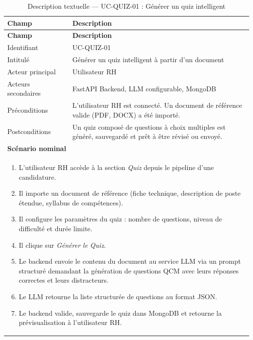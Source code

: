\renewcommand{\arraystretch}{1.4}
\begin{longtable}{|p{4cm}|p{10cm}|}
\caption{Description textuelle — UC-QUIZ-01 : Générer un quiz intelligent}
\label{tab:uc_quiz01} \\
\hline
\rowcolor[HTML]{EFEFEF} \textbf{Champ} & \textbf{Description} \\ \hline
\endfirsthead
\hline
\rowcolor[HTML]{EFEFEF} \textbf{Champ} & \textbf{Description} \\ \hline
\endhead
\hline
\endfoot
\hline
\endlastfoot
Identifiant & UC-QUIZ-01 \\ \hline
Intitulé & Générer un quiz intelligent à partir d'un document \\ \hline
Acteur principal & Utilisateur RH \\ \hline
Acteurs secondaires & FastAPI Backend, LLM configurable, MongoDB \\ \hline
Préconditions & L'utilisateur RH est connecté. Un document de référence valide (PDF, DOCX) a été importé. \\ \hline
Postconditions & Un quiz composé de questions à choix multiples est généré, sauvegardé et prêt à être révisé ou envoyé. \\ \hline
\multicolumn{2}{|l|}{\textbf{Scénario nominal}} \\ \hline
\multicolumn{2}{|p{14.5cm}|}{
\vspace{2pt}
\begin{enumerate}
    \item L'utilisateur RH accède à la section \textit{Quiz} depuis le pipeline d'une candidature.
    \item Il importe un document de référence (fiche technique, description de poste étendue, syllabus de compétences).
    \item Il configure les paramètres du quiz : nombre de questions, niveau de difficulté et durée limite.
    \item Il clique sur \textit{Générer le Quiz}.
    \item Le backend envoie le contenu du document au service LLM via un prompt structuré demandant la génération de questions QCM avec leurs réponses correctes et leurs distracteurs.
    \item Le LLM retourne la liste structurée de questions au format JSON.
    \item Le backend valide, sauvegarde le quiz dans MongoDB et retourne la prévisualisation à l'utilisateur RH.
\end{enumerate}
\vspace{2pt}
}
\end{longtable}
